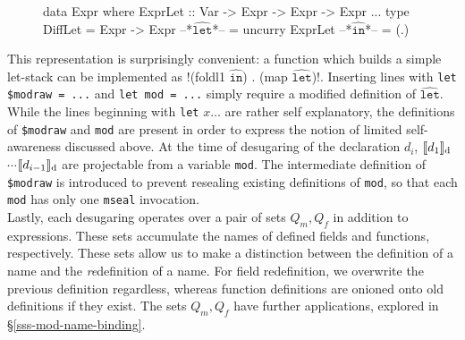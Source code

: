\documentclass{llncs}
\newcommand{\diffhat}[1]{\ensuremath{\widehat{\texttt{#1}}}}
\newcommand{\translate}[2]{\ensuremath{\llbracket\texttt{#2}\rrbracket_{\textnormal{#1}}}}
\begin{document}
\begin{figure}[h]
\begin{hscode}
data Expr where
	ExprLet :: Var -> Expr -> Expr -> Expr
	...
type DiffLet = Expr -> Expr
--*\diffhat{let}*-- = uncurry ExprLet
--*\diffhat{in}*-- = (.)
\end{hscode}
\end{figure}

This representation is surprisingly convenient: a function which builds a simple let-stack can be implemented as \hsil!(foldl1 $\diffhat{in}$) . (map $\diffhat{let}$)!. Inserting lines with \texttt{let \$modraw = ...} and \texttt{let mod = ...} simply require a modified definition of \diffhat{let}.\\
\indent While the lines beginning with \texttt{let} $x \ldots$ are rather self explanatory, the definitions of \texttt{\$modraw} and \texttt{mod} are present in order to express the notion of limited self-awareness discussed above. At the time of desugaring of the declaration $d_i$, \translate{d}{$d_1$}$\cdots$\translate{d}{$d_{i-1}$} are projectable from a variable \texttt{mod}. The intermediate definition of \texttt{\$modraw} is introduced to prevent resealing existing definitions of \texttt{mod}, so that each \texttt{mod} has only one \texttt{mseal} invocation.\\
\indent Lastly, each desugaring operates over a pair of sets $Q_m, Q_f$ in addition to expressions. These sets accumulate the names of defined fields and functions, respectively. These sets allow us to make a distinction between the definition of a name and the \emph{re}definition of a name. For field redefinition, we overwrite the previous definition regardless, whereas function definitions are onioned onto old definitions if they exist. The sets $Q_m, Q_f$ have further applications, explored in \S \ref{sss-mod-name-binding}.
\end{document}
